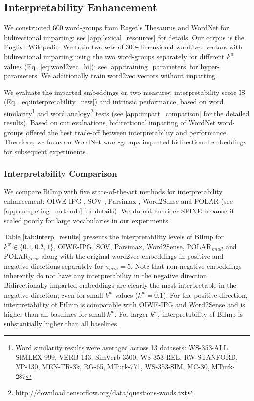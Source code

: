 \documentclass[11pt,a4paper]{article}
\def\proposedmethod{BiImp}
\begin{document}
\subsection{Interpretability Enhancement}

We constructed 600 word-groups from Roget's
Thesaurus and WordNet for bidirectional imparting: see \ref{app:lexical_resources} for details. 
Our corpus is the English Wikipedia.
We train two sets of 300-dimensional word2vec vectors with bidirectional imparting using
the two word-groups separately for
different $k^w$ values (Eq.\ 
\ref{eq:word2vec_bi}); see \ref{app:training_parameters} for hyper-parameters. We additionally train word2vec vectors without imparting.

We evaluate the  imparted embeddings
on two measures: 
interpretability score IS (Eq.\
\ref{eq:interpretability_new}) and intrinsic performance,
based on word similarity\footnote{Word similarity results
  were averaged across 13 datasets: WS-353-ALL, SIMLEX-999,
  VERB-143, SimVerb-3500, WS-353-REL, RW-STANFORD, YP-130,
  MEN-TR-3k, RG-65, MTurk-771, WS-353-SIM, MC-30, MTurk-287}
\citep{faruqui14communityEval} and word
analogy\footnote{http://download.tensorflow.org/data/questions-words.txt}
\citep{mikolov13word2vec_b} tests (see
\ref{app:impart_comparison} for the detailed results). Based
on our evaluations, bidirectional imparting of WordNet
word-groups offered the best trade-off between
interpretability and performance. Therefore, we focus on
WordNet word-groups imparted bidirectional embeddings for subsequent experiments.

\subsubsection{Interpretability Comparison}
We compare \proposedmethod{}
with five state-of-the-art methods for interpretability
enhancement: OIWE-IPG \citep{luo15online}, SOV
\citep{faruqui15sparse}, Parsimax \citep{park17rotated},
Word2Sense \citep{panigrahi19word2sense} and POLAR
\citep{mathew20polar} (see \ref{app:competing_methods} for
details).
We do not consider
SPINE \citep{subramanian18spine}  because it scaled poorly
for large vocabularies in our experiments.

Table
\ref{tab:interp_results} presents the interpretability
levels of \proposedmethod{} for $k^w \in \{0.1, 0.2, 1\}$,
OIWE-IPG, SOV, Parsimax, Word2Sense, POLAR$_{small}$ and
POLAR$_{large}$ along with the original word2vec embeddings
in positive and negative directions separately for $n_{min}
= 5$.  Note that non-negative embeddings inherently do not
have any interpretability in the negative
direction. Bidirectionally imparted embeddings are
clearly the most interpretable in the negative direction,
even for small $k^w$ values
($k^w = 0.1$). For the positive direction, interpretability
of \proposedmethod{} is comparable with OIWE-IPG and
Word2Sense and is higher than all baselines for
small $k^w$. For larger $k^w$, interpretability of
\proposedmethod{} is substantially higher than all baselines.
\end{document}
